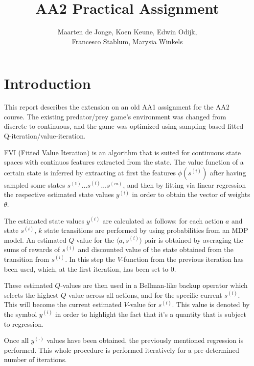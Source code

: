 \documentclass[a4paper, 12pt]{article}
\begin{document}
\title{AA2 Practical Assignment}
\author{Maarten de Jonge, Koen Keune, Edwin Odijk,\\ Francesco Stablum, Marysia Winkels}
\maketitle

\section*{Introduction}
This report describes the extension on an old AA1 assignment for the AA2 course. The existing predator/prey game's environment was changed from discrete to continuous, and the game was optimized using sampling based fitted Q-iteration/value-iteration.%

FVI (Fitted Value Iteration) is an algorithm that is suited for
continuous state spaces with continuos features extracted from
the state. 
The value function of a certain state is inferred by
extracting at first the features $\phi(s^{(i)})$ 
after having sampled some states 
$s^{(1)}\ldots s^{(i)} \ldots s^{(m)}$, 
and then by fitting via linear regression
the respective estimated state values $y^{(i)}$ 
in order to obtain the vector
of weights $\theta$.

The estimated state values $y^{(i)}$ are calculated as follows:
for each action $a$ and state $s^{(i)}$, 
$k$ state transitions are performed by using probabilities from 
an MDP model.
An estimated $Q$-value for the $\langle a,s^{(i)}\rangle$ pair is obtained
by averaging the sums of rewards of $s^{(i)}$ and
discounted value of the
state obtained from the transition from $s^{(i)}$.
In this step the $V$-function from the previous iteration has been used,
which, at the first iteration, has been set to 0.

These estimated $Q$-values are then used in a Bellman-like 
backup operator which selects the highest $Q$-value across all actions,
and for the specific current $s^{(i)}$.
This will become the current estimated $V$-value for $s^{(i)}$. 
This value is denoted
by the symbol $y^{(i)}$ in order to highlight the fact that it's 
a quantity that is subject to regression.

Once all $y^{(\cdot)}$ values have been obtained,
the previously mentioned regression is performed.
This whole procedure is performed iteratively for a pre-determined
number of iterations.
\end{document}

